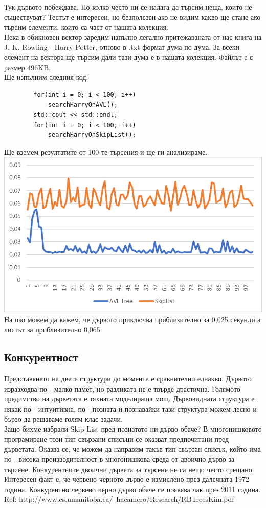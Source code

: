 \documentclass[a4paper,12pt,fleqn]{article}
\begin{document}
	Тук дървото побеждава. Но колко често ни се налага да търсим неща, които не съществуват? Тестът е интересен, но безполезен ако не видим какво ще стане ако търсим елементи, които са част от нашата колекция.\\
	Нека в обикновен вектор заредим напълно легално притежаваната от нас книга на J. K. Rowling - Harry Potter, отново в .txt формат дума по дума. За всеки елемент на вектора ще търсим дали тази дума е в нашата колекция. Файлът е с размер 496KB.\\
	Ще изпълним следния код:\\
	\begin{lstlisting}
		for(int i = 0; i < 100; i++)
			searchHarryOnAVL();
		std::cout << std::endl;
		for(int i = 0; i < 100; i++)
			searchHarryOnSkipList();
	\end{lstlisting}
	Ще вземем резултатите от 100-те търсения и ще ги анализираме.\\
	\includegraphics[scale=0.5]{searches.png}\\
	На око можем да кажем, че дървото приключва приблизително за 0,025 секунди а листът за приблизително 0,065. 

\subsection{Конкурентност}
Представянето на двете структури до момента е сравнително еднакво. Дървото изразходва по - малко памет, но разликата не е твърде драстична. Голямото предимство на дърветата е тяхната моделираща мощ. Дървовидната структура е някак по - интуитивна, по - позната и познавайки тази структура можем лесно и бързо да решаваме голям клас задачи.\\
Защо бихме избрали Skip-List пред познатото ни дърво обаче? В многонишковото програмиране този тип свързани списъци се оказват предпочитани пред дърветата.
Оказва се, че можем да направим такъв тип свързан списък, който има по - висока производителност в многонишкова среда от двоично дърво за търсене. Конкурентните двоични дървета за търсене не са нещо често срещано. Интересен факт е, че червено черното дърво е измислено през далечната 1972 година. Конкурентно червено черно дърво обаче се появява чак през 2011 година.\\
Ref: http://www.cs.umanitoba.ca/~hacamero/Research/RBTreesKim.pdf\\
\end{document}

